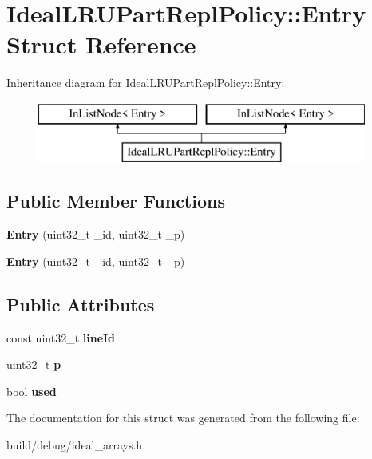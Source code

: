 \hypertarget{structIdealLRUPartReplPolicy_1_1Entry}{\section{Ideal\-L\-R\-U\-Part\-Repl\-Policy\-:\-:Entry Struct Reference}
\label{structIdealLRUPartReplPolicy_1_1Entry}
}
Inheritance diagram for Ideal\-L\-R\-U\-Part\-Repl\-Policy\-:\-:Entry\-:\begin{figure}[H]
\begin{center}
\leavevmode
\includegraphics[height=2.000000cm]{structIdealLRUPartReplPolicy_1_1Entry}
\end{center}
\end{figure}
\subsection*{Public Member Functions}
\begin{DoxyCompactItemize}
\item 
\hypertarget{structIdealLRUPartReplPolicy_1_1Entry_a83695ad1156d89ac833e458d6a5ea06c}{{\bfseries Entry} (uint32\-\_\-t \-\_\-id, uint32\-\_\-t \-\_\-p)}\label{structIdealLRUPartReplPolicy_1_1Entry_a83695ad1156d89ac833e458d6a5ea06c}

\item 
\hypertarget{structIdealLRUPartReplPolicy_1_1Entry_a83695ad1156d89ac833e458d6a5ea06c}{{\bfseries Entry} (uint32\-\_\-t \-\_\-id, uint32\-\_\-t \-\_\-p)}\label{structIdealLRUPartReplPolicy_1_1Entry_a83695ad1156d89ac833e458d6a5ea06c}

\end{DoxyCompactItemize}
\subsection*{Public Attributes}
\begin{DoxyCompactItemize}
\item 
\hypertarget{structIdealLRUPartReplPolicy_1_1Entry_a1036b5b4211c71dec55fb44c7747627c}{const uint32\-\_\-t {\bfseries line\-Id}}\label{structIdealLRUPartReplPolicy_1_1Entry_a1036b5b4211c71dec55fb44c7747627c}

\item 
\hypertarget{structIdealLRUPartReplPolicy_1_1Entry_abce594ee5f688615813e2f4ef97edde3}{uint32\-\_\-t {\bfseries p}}\label{structIdealLRUPartReplPolicy_1_1Entry_abce594ee5f688615813e2f4ef97edde3}

\item 
\hypertarget{structIdealLRUPartReplPolicy_1_1Entry_a17a8f5416e0db77d26a96751bd14e01f}{bool {\bfseries used}}\label{structIdealLRUPartReplPolicy_1_1Entry_a17a8f5416e0db77d26a96751bd14e01f}

\end{DoxyCompactItemize}


The documentation for this struct was generated from the following file\-:\begin{DoxyCompactItemize}
\item 
build/debug/ideal\-\_\-arrays.\-h\end{DoxyCompactItemize}
